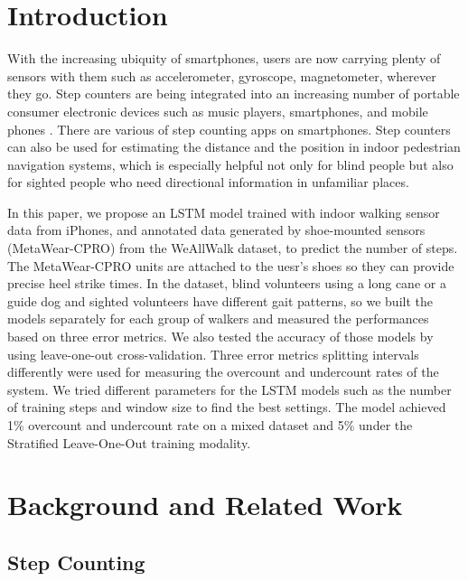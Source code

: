 \documentclass[11pt]{article}
\begin{document}
\section{Introduction}

With the increasing ubiquity of smartphones, users are now carrying plenty of sensors with them such as accelerometer, gyroscope, magnetometer, wherever they go. Step counters are being integrated into an increasing number of portable consumer electronic devices such as music players, smartphones, and mobile phones \cite{wiki:pedometer}. There are various of step counting apps on smartphones. Step counters can also be used for estimating the distance and the position in indoor pedestrian navigation systems, which is especially helpful not only for blind people but also for sighted people who need directional information in unfamiliar places.

In this paper, we propose an LSTM model trained with indoor walking sensor data from iPhones, and annotated data generated by shoe-mounted sensors (MetaWear-CPRO) from the WeAllWalk dataset, to predict the number of steps. The MetaWear-CPRO units are attached to the uesr's shoes so they can provide precise heel strike times. In the dataset, blind volunteers using a long cane or a guide dog and sighted volunteers have different gait patterns, so we built the models separately for each group of walkers and measured the performances based on three error metrics. We also tested the accuracy of those models by using leave-one-out cross-validation. Three error metrics splitting intervals differently were used for measuring the overcount and undercount rates of the system. We tried different parameters for the LSTM models such as the number of training steps and window size to find the best settings. The model achieved 1\% overcount and undercount rate on a mixed dataset and 5\% under the Stratified Leave-One-Out training modality.



\section{Background and Related Work}

\subsection{Step Counting}
\end{document}
